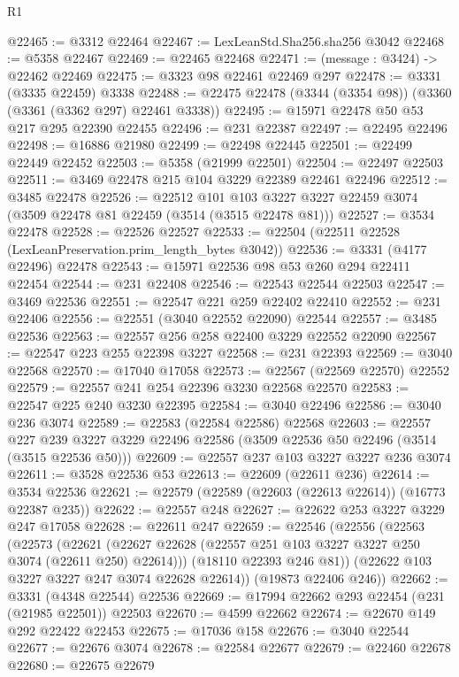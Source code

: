 \begin{lexlean}{R1}
\begin{coremodule}
@22465 := @3312 @22464
@22467 := LexLeanStd.Sha256.sha256 @3042
@22468 := @5358 @22467
@22469 := @22465 @22468
@22471 := (message : @3424) -> @22462 @22469
@22475 := @3323 @98 @22461 @22469 @297
@22478 := @3331 (@3335 @22459) @3338
@22488 := @22475 @22478 (@3344 (@3354 @98)) (@3360 (@3361 (@3362 @297) @22461 @3338))
@22495 := @15971 @22478 @50 @53 @217 @295 @22390 @22455
@22496 := @231 @22387
@22497 := @22495 @22496
@22498 := @16886 @21980
@22499 := @22498 @22445
@22501 := @22499 @22449 @22452
@22503 := @5358 (@21999 @22501)
@22504 := @22497 @22503
@22511 := @3469 @22478 @215 @104 @3229 @22389 @22461 @22496
@22512 := @3485 @22478
@22526 := @22512
    @101
    @103
    @3227
    @3227
    @22459
    @3074
    (@3509 @22478 @81 @22459 (@3514 (@3515 @22478 @81)))
@22527 := @3534 @22478
@22528 := @22526 @22527
@22533 := @22504 (@22511 @22528 (LexLeanPreservation.prim_length_bytes @3042))
@22536 := @3331 (@4177 @22496) @22478
@22543 := @15971 @22536 @98 @53 @260 @294 @22411 @22454
@22544 := @231 @22408
@22546 := @22543 @22544 @22503
@22547 := @3469 @22536
@22551 := @22547 @221 @259 @22402 @22410
@22552 := @231 @22406
@22556 := @22551 (@3040 @22552 @22090) @22544
@22557 := @3485 @22536
@22563 := @22557 @256 @258 @22400 @3229 @22552 @22090
@22567 := @22547 @223 @255 @22398 @3227
@22568 := @231 @22393
@22569 := @3040 @22568
@22570 := @17040 @17058
@22573 := @22567 (@22569 @22570) @22552
@22579 := @22557 @241 @254 @22396 @3230 @22568 @22570
@22583 := @22547 @225 @240 @3230 @22395
@22584 := @3040 @22496
@22586 := @3040 @236 @3074
@22589 := @22583 (@22584 @22586) @22568
@22603 := @22557
    @227
    @239
    @3227
    @3229
    @22496
    @22586
    (@3509 @22536 @50 @22496 (@3514 (@3515 @22536 @50)))
@22609 := @22557 @237 @103 @3227 @3227 @236 @3074
@22611 := @3528 @22536 @53
@22613 := @22609 (@22611 @236)
@22614 := @3534 @22536
@22621 := @22579 (@22589 (@22603 (@22613 @22614)) (@16773 @22387 @235))
@22622 := @22557 @248
@22627 := @22622 @253 @3227 @3229 @247 @17058
@22628 := @22611 @247
@22659 := @22546
    (@22556
      (@22563
        (@22573
          (@22621 (@22627 @22628 (@22557 @251 @103 @3227 @3227 @250 @3074 (@22611 @250) @22614)))
          (@18110 @22393 @246 @81))
        (@22622 @103 @3227 @3227 @247 @3074 @22628 @22614))
      (@19873 @22406 @246))
@22662 := @3331 (@4348 @22544) @22536
@22669 := @17994 @22662 @293 @22454 (@231 (@21985 @22501)) @22503
@22670 := @4599 @22662
@22674 := @22670 @149 @292 @22422 @22453
@22675 := @17036 @158
@22676 := @3040 @22544
@22677 := @22676 @3074
@22678 := @22584 @22677
@22679 := @22460 @22678
@22680 := @22675 @22679

\end{coremodule}
\end{lexlean}
